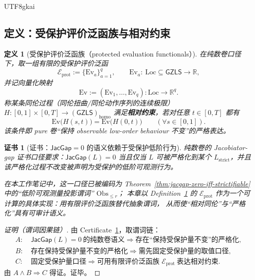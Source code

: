 \documentclass[12pt]{article}
\newtheorem{definition}{定义}[section]
\newtheorem{certificate}{证书}[section]
\newcommand{\GZLS}{\ensuremath{\mathsf{GZLS}}}
\newcommand{\JacGap}{\ensuremath{\mathsf{JacGap}}}
\begin{document}
\begin{CJK*}{UTF8}{gkai}
\subsection{定义：受保护评价泛函族与相对约束}

\begin{definition}[受保护评价泛函族（protected evaluation functionals）]
\label{def:protected-evaluation-functionals}
在纯数卷口径下，取一组有限的受保护评价泛函
\[
\mathcal{E}_{\mathrm{prot}}
:=
\{\mathrm{Ev}_a\}_{a=1}^{q},
\qquad
\mathrm{Ev}_a:\ \mathrm{Loc}\subseteq \GZLS\to \mathbb{R},
\]
并记向量化映射
\[
\mathrm{Ev}:=(\mathrm{Ev}_1,\ldots,\mathrm{Ev}_q):\mathrm{Loc}\to \mathbb{R}^q.
\]
称某条同伦过程（同伦扭曲/同伦动作序列的连续极限）$H:[0,1]\times[0,T]\to (\GZLS)_{\mathrm{homo}}$ 满足\textbf{相对约束}，若对任意 $t\in[0,T]$ 都有
\[
\mathrm{Ev}\bigl(H(s,t)\bigr)=\mathrm{Ev}\bigl(H(0,t)\bigr)
\qquad (\forall s\in[0,1]).
\]
该条件即 pure 卷“保持 observable low-order behaviour 不变”的严格表达。
\end{definition}

\begin{certificate}[证书：$\JacGap=0$ 的语义依赖于受保护低阶行为]
\label{cert:jacgap-needs-protected-observables}
纯数卷的 Jacobiator-gap 证书口径要求：$\JacGap(L)=0$ 当且仅当 $L$ 可被严格化到某个 $L_{\mathrm{strict}}$，并且该严格化过程不改变被声明为受保护的低阶可观测行为。

在本工作笔记中，这一口径已被编码为 Theorem~\ref{thm:jacgap-zero-iff-strictifiable} 中的“低阶可观测量投影谓词” $\mathrm{Obs}_{\le r}$；
本章以 Definition~\ref{def:protected-evaluation-functionals} 的 $\mathcal{E}_{\mathrm{prot}}$ 作为一个可计算的具体实现：用有限评价泛函族替代抽象谓词，
  从而使“相对同伦”与“严格化”具有可审计语义。
\end{certificate}

\begin{proof}[证明（谓词因果链）]
由 Certificate~\ref{cert:jacgap-needs-protected-observables}，取谓词链：
\[
\begin{aligned}
A:&\ \JacGap(L)=0\ \text{的纯数卷语义}\Rightarrow \text{存在“保持受保护量不变”的严格化},\\
B:&\ \text{存在保持受保护量不变的严格化}\Rightarrow \text{需先固定受保护量的取值口径},\\
C:&\ \text{固定受保护量口径}\Rightarrow \text{可用有限评价泛函族 }\mathcal{E}_{\mathrm{prot}}\ \text{表达相对约束}.
\end{aligned}
\]
由 $A\wedge B\Rightarrow C$ 得证。证毕。
\end{proof}


\end{CJK*}
\end{document}
